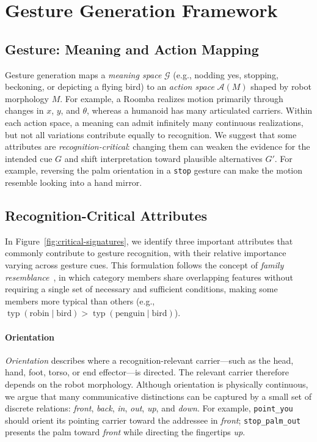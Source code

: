 \documentclass[letterpaper,10pt,conference]{ieeeconf}
\begin{document}
\section{Gesture Generation Framework}
\label{sec:gesture}

\subsection{Gesture: Meaning and Action Mapping}

Gesture generation maps a \emph{meaning space} $\mathcal{G}$ (e.g., nodding yes, stopping, beckoning, or depicting a flying bird) to an \emph{action space} $\mathcal{A}(M)$ shaped by robot morphology $M$. For example, a Roomba realizes motion primarily through changes in $x$, $y$, and $\theta$, whereas a humanoid has many articulated carriers. Within each action space, a meaning can admit infinitely many continuous realizations, but not all variations contribute equally to recognition. We suggest that some attributes are \emph{recognition-critical}: changing them can weaken the evidence for the intended cue $G$ and shift interpretation toward plausible alternatives $G'$. For example, reversing the palm orientation in a \texttt{stop} gesture can make the motion resemble looking into a hand mirror.

\subsection{Recognition-Critical Attributes}
\label{sec3.2}
In Figure~\ref{fig:critical-signatures}, we identify three important attributes that commonly contribute to gesture recognition, with their relative importance varying across gesture cues. This formulation follows the concept of \textit{family resemblance}~\cite{rosch1975family}, in which category members share overlapping features without requiring a single set of necessary and sufficient conditions, making some members more typical than others (e.g., $\operatorname{typ}(\text{robin}\mid\text{bird}) > \operatorname{typ}(\text{penguin}\mid\text{bird})$).

\paragraph{Orientation}
\textit{Orientation} describes where a recognition-relevant carrier---such as the head, hand, foot, torso, or end effector---is directed. The relevant carrier therefore depends on the robot morphology. Although orientation is physically continuous, we argue that many communicative distinctions can be captured by a small set of discrete relations: \textit{front}, \textit{back}, \textit{in}, \textit{out}, \textit{up}, and \textit{down}. For example, \texttt{point\_you} should orient its pointing carrier toward the addressee in \textit{front}; \texttt{stop\_palm\_out} presents the palm toward \textit{front} while directing the fingertips \textit{up}.
\end{document}
